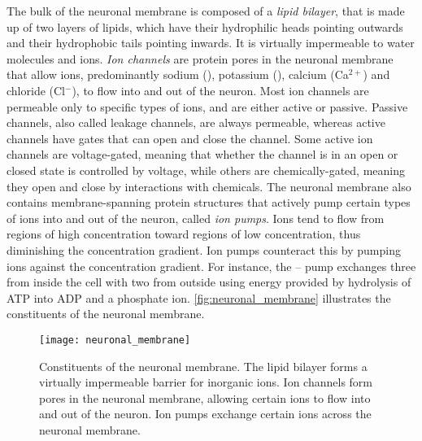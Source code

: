 The bulk of the neuronal membrane is composed of a \textit{lipid bilayer}, that is made up of two layers of lipids, which have their hydrophilic heads pointing outwards and their hydrophobic tails pointing inwards. It is virtually impermeable to water molecules and ions. \textit{Ion channels} are protein pores in the neuronal membrane that allow ions, predominantly sodium (\Na), potassium (\K), calcium (Ca$^{2+}$) and chloride (Cl$^{-}$), to flow into and out of the neuron. Most ion channels are permeable only to specific types of ions, and are either active or passive. Passive channels, also called leakage channels, are always permeable, whereas active channels have gates that can open and close the channel. Some active ion channels are voltage-gated, meaning that whether the channel is in an open or closed state is controlled by voltage, while others are chemically-gated, meaning they open and close by interactions with chemicals. The neuronal membrane also contains membrane-spanning protein structures that actively pump certain types of ions into and out of the neuron, called \textit{ion pumps}. Ions tend to flow from regions of high concentration toward regions of low concentration, thus diminishing the concentration gradient. Ion pumps counteract this by pumping ions against the concentration gradient. For instance, the \Na -- \K pump exchanges three \Na from inside the cell with two \K from outside using energy provided by hydrolysis of ATP into ADP and a phosphate ion. \autoref{fig:neuronal_membrane} illustrates the constituents of the neuronal membrane. 

\begin{figure}[!htb]
    \centering
    \texttt{[image: neuronal\_membrane]}
    \caption{Constituents of the neuronal membrane. The lipid bilayer forms a virtually impermeable barrier for inorganic ions. Ion channels form pores in the neuronal membrane, allowing certain ions to flow into and out of the neuron. Ion pumps exchange certain ions across the neuronal membrane. 
    }
    \label{fig:neuronal_membrane}
\end{figure}

